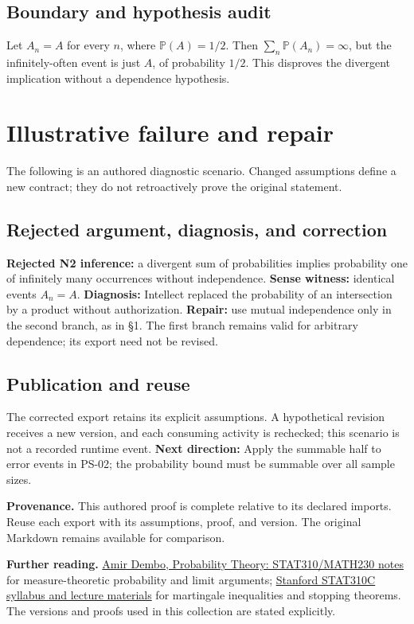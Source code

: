 \documentclass[preprint,12pt,aps,pra,showkeys,amsmath,amssymb,superscriptaddress,floatfix]{revtex4-2}
\theoremstyle{definition}
\theoremstyle{remark}
\begin{document}
\subsection{Boundary and hypothesis audit}

Let \(A_n=A\) for every \(n\), where \(\mathbb P(A)=1/2\). Then
\(\sum_n\mathbb P(A_n)=\infty\), but the infinitely-often event is just
\(A\), of probability \(1/2\). This disproves the divergent implication
without a dependence hypothesis.

\section{Illustrative failure and repair}

The following is an authored diagnostic scenario. Changed assumptions
define a new contract; they do not retroactively prove the original
statement.

\subsection{Rejected argument, diagnosis, and correction}
\textbf{Rejected N2 inference:} a divergent sum of probabilities implies
probability one of infinitely many occurrences without independence.
\textbf{Sense witness:} identical events \(A_n=A\). \textbf{Diagnosis:}
Intellect replaced the probability of an intersection by a product
without authorization. \textbf{Repair:} use mutual independence only in
the second branch, as in §1. The first branch remains valid for
arbitrary dependence; its export need not be revised.

\subsection{Publication and reuse}
The corrected export retains its explicit assumptions. A hypothetical
revision receives a new version, and each consuming activity is
rechecked; this scenario is not a recorded runtime event. \textbf{Next
direction:} Apply the summable half to error events in PS-02; the
probability bound must be summable over all sample sizes.

\par\medskip\begingroup\small\linespread{1.0}\selectfont\noindent\textbf{Provenance.} This authored proof is complete relative to its declared imports. Reuse
each export with its assumptions, proof, and version. The original
Markdown remains available for comparison.
\par\endgroup

\par\smallskip\begingroup\small\linespread{1.0}\selectfont\noindent\textbf{Further reading.} \href{https://stanford.edu/~montanar/TEACHING/Stat310A/lnotes.pdf}{Amir
Dembo, Probability Theory: STAT310/MATH230 notes} for measure-theoretic
probability and limit arguments;
\href{https://web.stanford.edu/class/stats310c/syllabus.html}{Stanford
STAT310C syllabus and lecture materials} for martingale inequalities and
stopping theorems. The versions and proofs used in this collection are
stated explicitly.\par\endgroup
\end{document}
